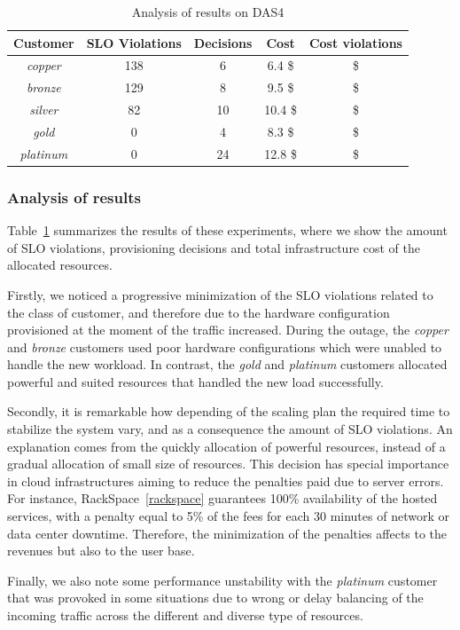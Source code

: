 \begin{table}
  {\scriptsize 
\begin{center}
    \begin{tabular}{  | c | c | c | c | c |}
    \hline
         \textbf{Customer}  & \textbf{SLO Violations} & \textbf{Decisions}  & \textbf{Cost}  & \textbf{Cost violations} \\ \hline
   \textit{copper}   & 138  &  6 &  6.4 \$ &  \$ \\ \hline   
   \textit{bronze}  &  129 &   8&  9.5 \$ &  \$ \\ \hline   
   \textit{silver}  &  82  & 10  &  10.4 \$ &   \$ \\ \hline   
   \textit{gold}  & 0  &  4  &   8.3 \$ &   \$ \\ \hline   
\textit{platinum} &  0 & 24 & 12.8 \$ &  \$ \\ \hline   

 \end{tabular}
\end{center}
\vspace{-5mm}
\caption{Analysis of results on DAS4}
\label{summaryDAS4}
}
\end{table}

\subsubsection{Analysis of results}

Table~\ref{summaryDAS4} summarizes the results of these experiments, where we show the amount of SLO violations, provisioning decisions and total infrastructure cost of the allocated resources. 

Firstly, we noticed a progressive minimization of the SLO violations related to the class of customer, and therefore due to the hardware configuration provisioned at the moment of the traffic increased. During the outage, the \emph{copper} and \emph{bronze} customers used poor hardware configurations which were unabled to handle the new workload. In contrast, the \emph{gold}  and \emph{platinum} customers allocated powerful and suited resources that handled the new load successfully.

Secondly, it is remarkable how depending of the scaling plan the required time to stabilize the system vary, and as a consequence the amount of SLO violations. An explanation comes from the quickly allocation of powerful resources, instead of a gradual allocation of small size of resources. This decision has special importance in cloud infrastructures aiming to reduce the penalties paid due to server errors. For instance, RackSpace~\ref{rackspace} guarantees 100\% availability of the hosted services, with a penalty equal to 5\% of the fees for each 30 minutes of network or data center downtime. Therefore, the minimization of the penalties affects to the revenues but also to the user base.

Finally, we also note some performance unstability with the \emph{platinum} customer that was provoked in some situations due to wrong or delay balancing of the incoming traffic across the different and diverse type of resources.

